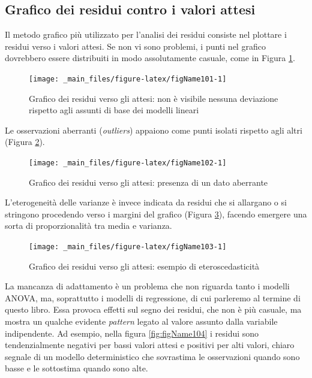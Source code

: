 \documentclass[a4paper,12pt,oneside]{book}
\begin{document}
\hypertarget{grafico-dei-residui-contro-i-valori-attesi}{%
\subsection{Grafico dei residui contro i valori attesi}\label{grafico-dei-residui-contro-i-valori-attesi}}

Il metodo grafico più utilizzato per l'analisi dei residui consiste nel plottare i residui verso i valori attesi. Se non vi sono problemi, i punti nel grafico dovrebbero essere distribuiti in modo assolutamente casuale, come in Figura \ref{fig:figName101}.

\begin{figure}

{\centering \texttt{[image: \_main\_files/figure-latex/figName101-1]} 

}

\caption{Grafico dei residui verso gli attesi: non è visibile nessuna deviazione rispetto agli assunti di base dei modelli lineari}\label{fig:figName101}
\end{figure}

Le osservazioni aberranti (\emph{outliers}) appaiono come punti isolati rispetto agli altri (Figura \ref{fig:figName102}).

\begin{figure}

{\centering \texttt{[image: \_main\_files/figure-latex/figName102-1]} 

}

\caption{Grafico dei residui verso gli attesi: presenza di un dato aberrante}\label{fig:figName102}
\end{figure}

L'eterogeneità delle varianze è invece indicata da residui che si allargano o si stringono procedendo verso i margini del grafico (Figura \ref{fig:figName103}), facendo emergere una sorta di proporzionalità tra media e varianza.

\begin{figure}

{\centering \texttt{[image: \_main\_files/figure-latex/figName103-1]} 

}

\caption{Grafico dei residui verso gli attesi: esempio di eteroscedasticità}\label{fig:figName103}
\end{figure}

La mancanza di adattamento è un problema che non riguarda tanto i modelli ANOVA, ma, soprattutto i modelli di regressione, di cui parleremo al termine di questo libro. Essa provoca effetti sul segno dei residui, che non è più casuale, ma mostra un qualche evidente \emph{pattern} legato al valore assunto dalla variabile indipendente. Ad esempio, nella figura \ref{fig:figName104} i residui sono tendenzialmente negativi per bassi valori attesi e positivi per alti valori, chiaro segnale di un modello deterministico che sovrastima le osservazioni quando sono basse e le sottostima quando sono alte.
\end{document}
